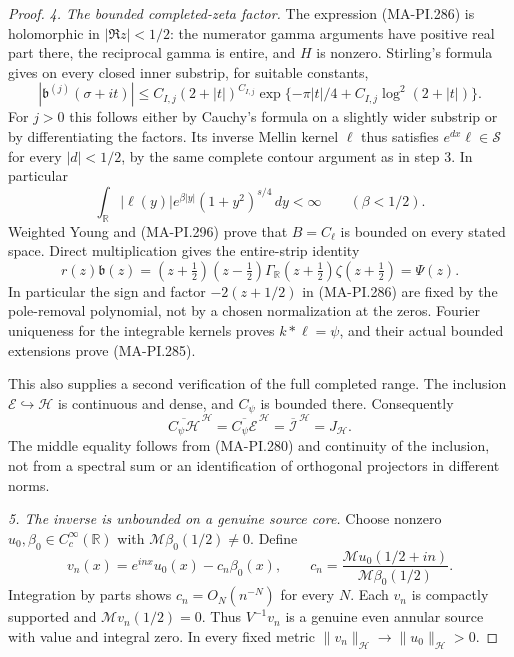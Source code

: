 \begin{proof}
\emph{4. The bounded completed-zeta factor.}
The expression (MA-PI.286) is holomorphic in
\(|\Re z|<1/2\): the numerator gamma arguments
have positive real part there, the reciprocal
gamma is entire, and \(H\) is nonzero.
Stirling's formula gives on every closed inner
substrip, for suitable constants,
\[
 |\mathfrak b^{(j)}(\sigma+it)|
 \le C_{I,j}(2+|t|)^{C_{I,j}}
       \exp\{-\pi|t|/4+
                         C_{I,j}\log^2(2+|t|)\}.
 \tag{MA-PI.297}
\]
For \(j>0\) this follows either by Cauchy's formula
on a slightly wider substrip or by differentiating
the factors.  Its inverse Mellin kernel \(\ell\)
thus satisfies \(e^{dx}\ell\in\mathcal S\) for
every \(|d|<1/2\), by the same complete contour
argument as in step 3.  In particular
\[
 \int_{\mathbb R}|\ell(y)|
           e^{\beta|y|}(1+y^2)^{s/4}\,dy<\infty
             \qquad(\beta<1/2).
 \tag{MA-PI.298}
\]
Weighted Young and (MA-PI.296) prove that
\(B=C_\ell\) is bounded on every stated space.
Direct multiplication gives the entire-strip
identity
\[
        r(z)\mathfrak b(z)
           =(z+\tfrac12)(z-\tfrac12)
             \Gamma_{\mathbb R}(z+\tfrac12)
                       \zeta(z+\tfrac12)=\Psi(z).
 \tag{MA-PI.299}
\]
In particular the sign and factor \(-2(z+1/2)\)
in (MA-PI.286) are fixed by the pole-removal
polynomial, not by a chosen normalization at the
zeros.  Fourier uniqueness for the integrable
kernels proves \(k*\ell=\psi\), and their actual
bounded extensions prove (MA-PI.285).

This also supplies a second verification of the
full completed range.  The inclusion
\(\mathcal E\hookrightarrow\mathscr H\) is continuous
and dense, and \(C_\psi\) is bounded there.
Consequently
\[
 \overline{C_\psi\mathscr H}^{\,\mathscr H}
   =\overline{C_\psi\mathcal E}^{\,\mathscr H}
   =\overline{\mathscr I}^{\,\mathscr H}
   =J_{\mathscr H}.
 \tag{MA-PI.300}
\]
The middle equality follows from (MA-PI.280)
and continuity of the inclusion, not from a
spectral sum or an identification of orthogonal
projectors in different norms.

\emph{5. The inverse is unbounded on a genuine source core.}
Choose nonzero \(u_0,\beta_0\in C_c^\infty(\mathbb R)\)
with \(\mathcal M\beta_0(1/2)\ne0\).  Define
\[
 v_n(x)=e^{inx}u_0(x)-c_n\beta_0(x),\qquad
 c_n=\frac{\mathcal Mu_0(1/2+in)}
            {\mathcal M\beta_0(1/2)}.
 \tag{MA-PI.301}
\]
Integration by parts shows \(c_n=O_N(n^{-N})\)
for every \(N\).  Each \(v_n\) is compactly
supported and \(\mathcal Mv_n(1/2)=0\).
Thus \(V^{-1}v_n\) is a genuine even annular
source with value and integral zero.  In every
fixed metric
\(\|v_n\|_{\mathscr H}\to\|u_0\|_{\mathscr H}>0\).


\end{proof}
